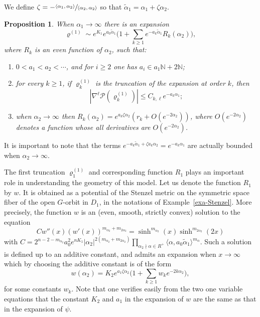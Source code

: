 \documentclass[JEP,XML,SOM,Unicode, NoEqCountersInSection, NoFloatCountersInSection]{cedram}
\theoremstyle{plain}
\newtheorem{prop}[thm]{Proposition}
\theoremstyle{definition}
\newcommand{\ta}{\tilde \alpha}
\newcommand{\rRoots}{R}
\newcommand{\opP}{\mathcal{P}}
\newcommand{\rhoun}{\varrho^{(1)}}
\begin{document}
We define $\zeta=-\sfrac{\langle\alpha_1,\alpha_2\rangle}{\langle\alpha_2,\alpha_2\rangle}$ so that $\ta_1=\alpha_1+\zeta\alpha_2$.

\begin{prop}\label{prop:refin-model-near-1}
When $\alpha_1\to\infty$ there is an expansion
\begin{equation}
\rhoun \sim e^{K_1}e^{a_0\ta_1} \Big( 1 + \sum_{k\geq1} e^{-a_k\ta_1}R_k(\alpha_2) \Big),\label{eq:17}
\end{equation}
where $R_k$ is an even function of $\alpha_2$, such that:
\begin{enumerate}
\item $0<a_1<a_2<\cdots$, and for $i\geq2$ one has $a_i\in a_1\mathbb{N}+2\mathbb{N}$;
\item for every $k\geq1$, if $\rhoun_k$ is the truncation of the expansion at order $k$, then
\begin{equation}
|\nabla^\ell \opP(\rhoun_k)| \leq C_{k,\ell} e^{-a_k\alpha_1};\label{eq:23}
\end{equation}
\item when $\alpha_2\to\infty$ then $R_k(\alpha_2) = e^{a_k \zeta \alpha_2} (r_k + O(e^{-2\alpha_2}))$, where $O(e^{-2\alpha_2})$ denotes a function whose all derivatives are $O(e^{-2\alpha_2})$.
\end{enumerate}
\end{prop}

It is important to note that the terms $e^{-a_k\ta_1+\zeta a_k\alpha_2}=e^{-a_k\alpha_1}$ are actually bounded when $\alpha_2\to\infty$.

The first truncation $\rhoun_1$ and corresponding function $R_1$ plays an important
role in understanding the geometry of this model. Let us denote the function $R_1$ by $w$.
It is obtained as a potential of the Stenzel metric on the symmetric space fiber of the open $G$-orbit
in $D_1$, in the notations of Example~\ref{exa-Stenzel}.
More precisely, the function $w$ is an (even, smooth, strictly convex) solution to the equation
\[ Cw''(x)(w'(x))^{m_{\alpha_2}+m_{2\alpha_2}}=\sinh^{m_{\alpha_2}}(x)\sinh^{m_{2\alpha_2}}(2x) \]
with
$C=2^{n-2-m_{\alpha_2}}a_0^2e^{nK_1}|\alpha_2|^{2(m_{\alpha_2}+m_{2\alpha_2})}
\prod_{\alpha_2 \nmid \alpha\in\rRoots^+}\langle\alpha,a_0\ta_1\rangle^{m_{\alpha}}$.
Such a solution is defined up to an additive constant, and admits an expansion when $x\to \infty$
which by choosing the additive constant is of the form
\begin{equation}
w(\alpha_2) = K_2e^{a_1\zeta\alpha_2} \Big( 1 + \sum_{k\geq1} w_ke^{-2k\alpha_2} \Big),\label{eq:15}
\end{equation}
for some constants $w_k$.
Note that one verifies easily from the two one variable equations that the constant $K_2$ and $a_1$
in the expansion of $w$ are the same as that in the expansion of $\psi$.
\end{document}
